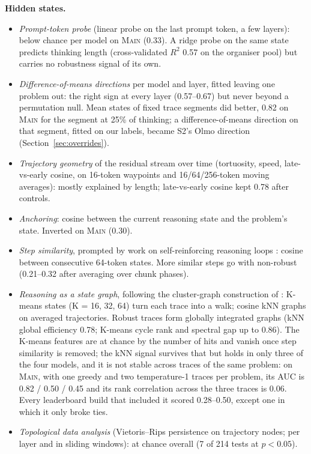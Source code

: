 \documentclass{article}
\newcommand{\stwo}{\textsc{S2}}
\begin{document}
\textbf{Hidden states.}
\begin{itemize}
\item \emph{Prompt-token probe} (linear probe on the last prompt token, a few layers): below chance per model on \textsc{Main} (0.33). A ridge probe on the same state predicts thinking length (cross-validated $R^2$ 0.57 on the organiser pool) but carries no robustness signal of its own.
\item \emph{Difference-of-means directions} per model and layer, fitted leaving one problem out: the right sign at every layer (0.57--0.67) but never beyond a permutation null. Mean states of fixed trace segments did better, 0.82 on \textsc{Main} for the segment at 25\% of thinking; a difference-of-means direction on that segment, fitted on our labels, became \stwo{}'s Olmo direction (Section~\ref{sec:overrides}).
\item \emph{Trajectory geometry} of the residual stream over time (tortuosity, speed, late-vs-early cosine, on 16-token waypoints and 16/64/256-token moving averages): mostly explained by length; late-vs-early cosine kept 0.78 after controls.
\item \emph{Anchoring}: cosine between the current reasoning state and the problem's state. Inverted on \textsc{Main} (0.30).
\item \emph{Step similarity}, prompted by work on self-reinforcing reasoning loops \citep{duan2026loops}: cosine between consecutive 64-token states. More similar steps go with non-robust (0.21--0.32 after averaging over chunk phases).
\item \emph{Reasoning as a state graph}, following the cluster-graph construction of \citet{duan2026loops}: K-means states (K = 16, 32, 64) turn each trace into a walk; cosine kNN graphs on averaged trajectories. Robust traces form globally integrated graphs (kNN global efficiency 0.78; K-means cycle rank and spectral gap up to 0.86). The K-means features are at chance by the number of hits and vanish once step similarity is removed; the kNN signal survives that but holds in only three of the four models, and it is not stable across traces of the same problem: on \textsc{Main}, with one greedy and two temperature-1 traces per problem, its AUC is 0.82 / 0.50 / 0.45 and its rank correlation across the three traces is 0.06. Every leaderboard build that included it scored 0.28--0.50, except one in which it only broke ties.
\item \emph{Topological data analysis} \citep{tan2025shape} (Vietoris--Rips persistence on trajectory nodes; per layer and in sliding windows): at chance overall (7 of 214 tests at $p<0.05$).

\end{itemize}
\end{document}
